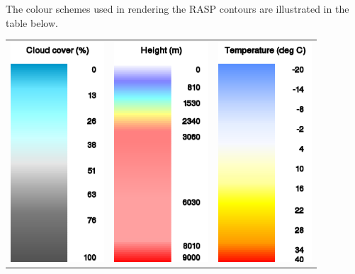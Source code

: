 \documentclass[a4paper,12pt]{refrep}
\begin{document}
\begin{maxipage}
The colour schemes used in rendering the RASP contours are illustrated
in the table below.

\begin{longtable}{c c c}
\includegraphics[angle=0,width=3.5cm,keepaspectratio='true']{figures/ramp-rasp-cloudpct.png}&

\includegraphics[angle=0,width=3.5cm,keepaspectratio='true']{figures/ramp-rasp-h.png}&

\includegraphics[angle=0,width=3.5cm,keepaspectratio='true']{figures/ramp-rasp-temperature.png}\\


\end{longtable}
\end{maxipage}
\end{document}
